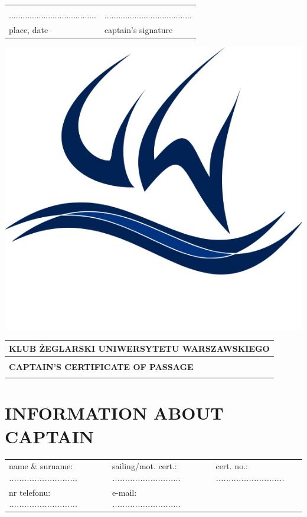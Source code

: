 \documentclass{article}
\begin{document}
\begin{tabularx}{\textwidth}{X X}
\\\\
...................................... & ......................................\\
place, date & captain's signature\\
\end{tabularx}
\newpage
\begin{minipage}{0.11\textwidth}
\includegraphics[width=\textwidth]{logo.png}
\end{minipage}
\begin{minipage}{0.89\textwidth}
\begin{tabularx}{\textwidth} { 
  | >{\centering\arraybackslash}X | }
 \hline
 \textbf{KLUB ŻEGLARSKI UNIWERSYTETU WARSZAWSKIEGO} \\
 \hline
 \\
 \textbf{\huge CAPTAIN’S  CERTIFICATE  OF  PASSAGE} \\
 \\
\hline
\end{tabularx}
\end{minipage}

\section*{INFORMATION ABOUT CAPTAIN}
\begin{tabularx}{\textwidth}{X X X}
name \& surname: \textit{...........................} & sailing/mot. cert.: \textit{...........................} & cert. no.: \textit{...........................} \\
nr telefonu: \textit{...........................} & e-mail: \textit{...........................} \\
\end{tabularx}
\end{document}
